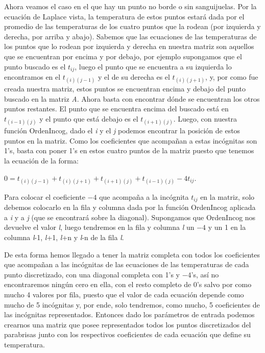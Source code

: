 \documentclass[10pt, a4paper]{article}
\begin{document}
	Ahora veamos el caso en el que hay un punto no borde o sin sanguijuelas. Por la ecuaci\'on de Laplace vista, la temperatura de estos puntos estar\'a dada por el promedio de las temperaturas de los cuatro puntos que la rodean (por izquierda y derecha, por arriba y abajo). Sabemos que las ecuaciones de las temperaturas de los puntos que lo rodean por izquierda y derecha en nuestra matriz son aquellos que se encuentran por encima y por debajo, por ejemplo supongamos que el punto buscado es el $t_{ij}$, luego el punto que se encuentra a su izquierda lo encontramos en el $ t_{(i)(j-1)}$ y el de su derecha es el $t_{(i)(j+1)}$, y, por como fue creada nuestra matriz, estos puntos se encuentran encima y debajo del punto buscado en la matriz \textit{A}. Ahora basta con encontrar d\'onde se encuentran los otros puntos restantes. El punto que se encuentra encima del buscado est\'a en $t_{(i-1)(j)}$ y el punto que est\'a debajo es el $t_{(i+1)(j)}$. Luego, con nuestra funci\'on OrdenIncog, dado el \textit{i} y el \textit{j} podemos encontrar la posici\'on de estos puntos en la matriz. Como los coeficientes que acompañan a estas inc\'ognitas son 1's, basta con poner 1's en estos cuatro puntos de la matriz puesto que tenemos la ecuaci\'on de la forma:
\begin{center}
	$0=t_{(i)(j-1)}+t_{(i)(j+1)}+t_{(i+1)(j)}+t_{(i-1)(j)}-4t_{ij}$. 
\end{center}
	Para colocar el coeficiente $-4$ que acompaña a la inc\'ognita $t_{ij}$ en la matriz, solo debemos colocarlo en la fila y columna dada por la funci\'on OrdenIncog aplicada a \textit{i} y a \textit{j} (que se encontrar\'a sobre la diagonal). Supongamos que OrdenIncog nos devuelve el valor \textit{l}, luego tendremos en la fila y columna \textit{l} un $-4$ y un 1 en la columna \textit{l}-1, \textit{l}+1, \textit{l}+n y \textit{l}-n de la fila \textit{l}.
	
	De esta forma hemos llegado a tener la matriz completa con todos los coeficientes que acompañan a las inc\'ognitas de las ecuaciones de las temperaturas de cada punto discretizado, con una diagonal completa con 1's y $-4$'s, as\'i no encontraremos ning\'un cero en ella, con el resto completo de 0's salvo por como mucho 4 valores por fila, puesto que el valor de cada ecuaci\'on depende como mucho de 5 inc\'ognitas y, por ende, solo tendremos, como mucho, 5 coeficientes de las inc\'ognitas representados.  Entonces dado los par\'ametros de entrada podemos crearnos una matriz que posee representados todos los puntos discretizados del parabrisas junto con los respectivos coeficientes de cada ecuaci\'on que define su temperatura. 
	
\end{document}
